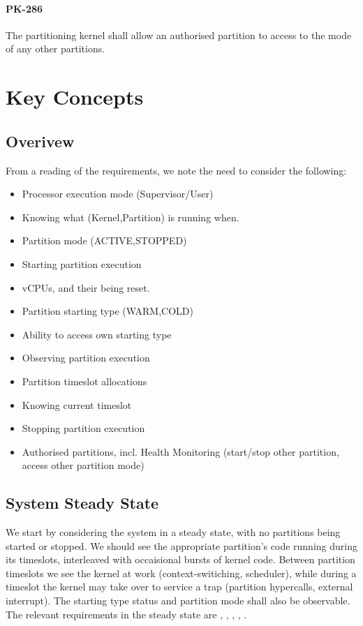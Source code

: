 \paragraph{PK-286}
The partitioning kernel shall allow an authorised partition
to access to the mode of any other partitions.

\newpage
\section{Key Concepts}

\subsection{Overivew }
From a reading of the requirements,
we note the need to consider the following:
\begin{itemize}
  \item Processor execution mode (Supervisor/User)
  \item Knowing what (Kernel,Partition) is running when.
  \item Partition mode (ACTIVE,STOPPED)
  \item Starting partition execution
  \item vCPUs, and their being reset.
  \item Partition starting type (WARM,COLD)
  \item Ability to access own starting type
  \item Observing partition execution
  \item Partition timeslot allocations
  \item Knowing current timeslot
  \item Stopping partition execution
  \item Authorised partitions, incl. Health Monitoring
       (start/stop other partition,
        access other partition mode)
\end{itemize}

\subsection{System Steady State}

We start by considering the system in a steady state,
with no partitions being started or stopped.
We should see the appropriate partition's code running
during its timeslots,
interleaved with occaisional bursts of kernel code.
Between partition timeslots we see the kernel at work
(context-switiching, scheduler),
while during a timeslot the kernel may take over to service
a trap (partition hypercalls, external interrupt).
The starting type status and partition mode shall also be observable.
The relevant requirements in the steady state are
, , , , .

